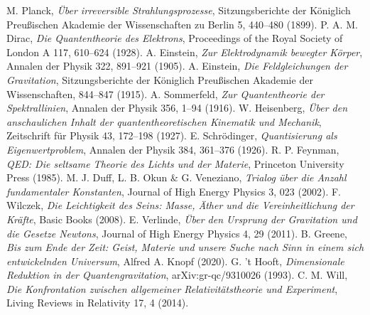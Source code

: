 \documentclass[12pt,a4paper]{article}
\begin{document}
\begin{thebibliography}{99}
 M. Planck, \textit{Über irreversible Strahlungsprozesse}, Sitzungsberichte der Königlich Preußischen Akademie der Wissenschaften zu Berlin 5, 440–480 (1899).
 P. A. M. Dirac, \textit{Die Quantentheorie des Elektrons}, Proceedings of the Royal Society of London A 117, 610–624 (1928).
 A. Einstein, \textit{Zur Elektrodynamik bewegter Körper}, Annalen der Physik 322, 891–921 (1905).
 A. Einstein, \textit{Die Feldgleichungen der Gravitation}, Sitzungsberichte der Königlich Preußischen Akademie der Wissenschaften, 844–847 (1915).
 A. Sommerfeld, \textit{Zur Quantentheorie der Spektrallinien}, Annalen der Physik 356, 1–94 (1916).
 W. Heisenberg, \textit{Über den anschaulichen Inhalt der quantentheoretischen Kinematik und Mechanik}, Zeitschrift für Physik 43, 172–198 (1927).
 E. Schrödinger, \textit{Quantisierung als Eigenwertproblem}, Annalen der Physik 384, 361–376 (1926).
 R. P. Feynman, \textit{QED: Die seltsame Theorie des Lichts und der Materie}, Princeton University Press (1985).
 M. J. Duff, L. B. Okun \& G. Veneziano, \textit{Trialog über die Anzahl fundamentaler Konstanten}, Journal of High Energy Physics 3, 023 (2002).
 F. Wilczek, \textit{Die Leichtigkeit des Seins: Masse, Äther und die Vereinheitlichung der Kräfte}, Basic Books (2008).
 E. Verlinde, \textit{Über den Ursprung der Gravitation und die Gesetze Newtons}, Journal of High Energy Physics 4, 29 (2011).
 B. Greene, \textit{Bis zum Ende der Zeit: Geist, Materie und unsere Suche nach Sinn in einem sich entwickelnden Universum}, Alfred A. Knopf (2020).
 G. 't Hooft, \textit{Dimensionale Reduktion in der Quantengravitation}, arXiv:gr-qc/9310026 (1993).
 C. M. Will, \textit{Die Konfrontation zwischen allgemeiner Relativitätstheorie und Experiment}, Living Reviews in Relativity 17, 4 (2014).
\end{thebibliography}
\end{document}
